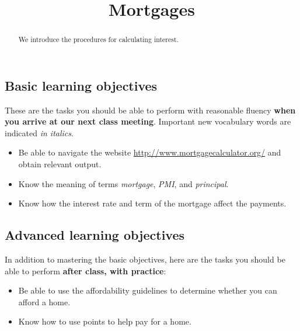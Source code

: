 \documentclass{ximera}
\title{Mortgages}
\begin{document}
\begin{abstract}
We introduce the procedures for calculating interest.
\end{abstract}
\maketitle

\subsection*{Basic learning objectives}

These are the tasks you should be able to perform with reasonable fluency \textbf{when you arrive at our next class meeting}. Important new vocabulary words are indicated \emph{in italics}. 

\begin{itemize}
	\item Be able to navigate the website \url{http://www.mortgagecalculator.org/} and obtain relevant output.
    \item Know the meaning of terms \emph{mortgage}, \emph{PMI}, and \emph{principal}. 
    \item Know how the interest rate and term of the mortgage affect the payments.
\end{itemize}

\subsection*{Advanced learning objectives}

In addition to mastering the basic objectives, here are the tasks you should be able to perform \textbf{after class, with practice}: 

\begin{itemize}
	\item Be able to use the affordability guidelines to determine whether you can afford a home.
    \item Know how to use points to help pay for a home.
\end{itemize}
\end{document}
